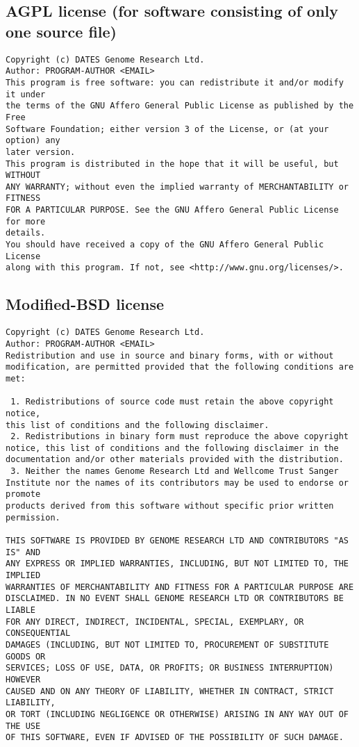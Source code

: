 \documentclass[10pt,a4paper]{article}
\begin{document}
\subsection{AGPL license (for software consisting of only one source file)}
\begin{boilerplate}
\begin{verbatim}
Copyright (c) DATES Genome Research Ltd. 
Author: PROGRAM-AUTHOR <EMAIL> 
This program is free software: you can redistribute it and/or modify it under 
the terms of the GNU Affero General Public License as published by the Free 
Software Foundation; either version 3 of the License, or (at your option) any 
later version. 
This program is distributed in the hope that it will be useful, but WITHOUT 
ANY WARRANTY; without even the implied warranty of MERCHANTABILITY or FITNESS 
FOR A PARTICULAR PURPOSE. See the GNU Affero General Public License for more 
details. 
You should have received a copy of the GNU Affero General Public License 
along with this program. If not, see <http://www.gnu.org/licenses/>. 
\end{verbatim}
\end{boilerplate}

\subsection{Modified-BSD license}
\begin{boilerplate}
\begin{verbatim}
Copyright (c) DATES Genome Research Ltd. 
Author: PROGRAM-AUTHOR <EMAIL> 
Redistribution and use in source and binary forms, with or without 
modification, are permitted provided that the following conditions are met: 
 
 1. Redistributions of source code must retain the above copyright notice, 
this list of conditions and the following disclaimer. 
 2. Redistributions in binary form must reproduce the above copyright 
notice, this list of conditions and the following disclaimer in the 
documentation and/or other materials provided with the distribution. 
 3. Neither the names Genome Research Ltd and Wellcome Trust Sanger 
Institute nor the names of its contributors may be used to endorse or promote 
products derived from this software without specific prior written permission. 
 
THIS SOFTWARE IS PROVIDED BY GENOME RESEARCH LTD AND CONTRIBUTORS "AS IS" AND 
ANY EXPRESS OR IMPLIED WARRANTIES, INCLUDING, BUT NOT LIMITED TO, THE IMPLIED 
WARRANTIES OF MERCHANTABILITY AND FITNESS FOR A PARTICULAR PURPOSE ARE 
DISCLAIMED. IN NO EVENT SHALL GENOME RESEARCH LTD OR CONTRIBUTORS BE LIABLE 
FOR ANY DIRECT, INDIRECT, INCIDENTAL, SPECIAL, EXEMPLARY, OR CONSEQUENTIAL 
DAMAGES (INCLUDING, BUT NOT LIMITED TO, PROCUREMENT OF SUBSTITUTE GOODS OR 
SERVICES; LOSS OF USE, DATA, OR PROFITS; OR BUSINESS INTERRUPTION) HOWEVER 
CAUSED AND ON ANY THEORY OF LIABILITY, WHETHER IN CONTRACT, STRICT LIABILITY, 
OR TORT (INCLUDING NEGLIGENCE OR OTHERWISE) ARISING IN ANY WAY OUT OF THE USE 
OF THIS SOFTWARE, EVEN IF ADVISED OF THE POSSIBILITY OF SUCH DAMAGE.
\end{verbatim}
\end{boilerplate}
\end{document}
